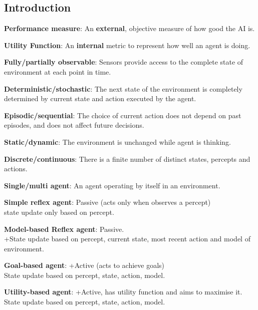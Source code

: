 \documentclass[a4paper,landscape]{article}
\newcommand{\rntopic}[1]{\vspace{-2.0em}\subsection*{#1}\vspace{-1.0em}}
\newcommand{\rnname}[1]{\textbf{#1}}
\begin{document}
\footnotesize
{}
\vspace*{-\baselineskip}\leavevmode
\vspace{-1.2cm}

\begin{multicols*}{4}

\raggedright

\rntopic{Introduction}
\begin{flatitemize}
\vspace{0.3cm}
\item \rnname{Performance measure}: An \textbf{external}, objective measure of how good the AI is.
\item \rnname{Utility Function}: An \textbf{internal} metric to represent how well an agent is doing.
\item \rnname{Fully/partially observable}: Sensors provide access to the complete state of environment at each point in time.
\item \rnname{Deterministic/stochastic}: The next state of the environment is completely determined by current state and action executed by the agent.
\item \rnname{Episodic/sequential}: The choice of current action does not depend on past episodes, and does not affect future decisions.
\item \rnname{Static/dynamic}: The environment is unchanged while agent is thinking.
\item \rnname{Discrete/continuous}: There is a finite number of distinct states, percepts and actions.
\item \rnname{Single/multi agent}: An agent operating by itself in an environment.
\item \rnname{Simple reflex agent}: Passive (acts only when observes a percept)\\
state update only based on percept.
\item \rnname{Model-based Reflex agent}: Passive. \\
+State update based on percept, current state, most recent action and model of environment.
\item \rnname{Goal-based agent}:
+Active (acts to achieve goals)\\
State update based on percept, state, action, model.
\item \rnname{Utility-based agent}: 
+Active, has utility function and aims to maximise it.\\
State update based on percept, state, action, model.
\end{flatitemize}



\end{multicols*}
\end{document}
